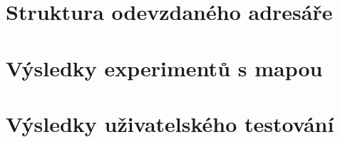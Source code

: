 
%






\chapter{Struktura odevzdaného adresáře}\label{chap:file_directory}

\chapter{Výsledky experimentů s mapou}\label{chap:map_experiments}

\chapter{Výsledky uživatelského testování}\label{chap:user_testing}

